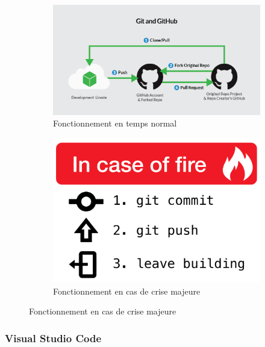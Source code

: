 \documentclass{article}
\begin{document}
\begin{figure}[h!]
	\centering
  	\begin{subfigure}[b]{0.68\linewidth}
	\includegraphics[width=\linewidth]{githubf.png}
	\caption{Fonctionnement en temps normal}	
  	\end{subfigure}
	\begin{subfigure}[b]{0.3\linewidth}
	\includegraphics[width=\linewidth]{gitf.png}
	\caption{Fonctionnement en cas de crise majeure}
  \end{subfigure}
\end{figure}

\newpage
\subsubsection{Visual Studio Code}
\end{document}
